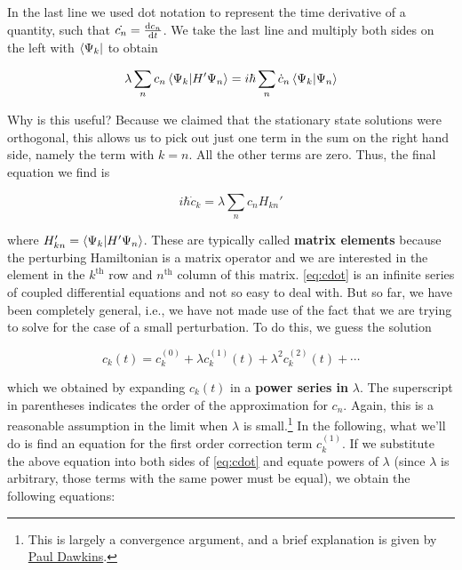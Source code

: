 In the last line we used dot notation to represent the time derivative of a quantity, such that $\dot{c_n} = \dv{c_n}{t}$. 
We take the last line and multiply both sides on the left with $\bra{\Psi_k}$ to obtain

\begin{equation*}
	\lambda \sum_n c_n \braket{\Psi_k}{H'\Psi_n} = i\hbar \sum_n \dot{c}_n \braket{\Psi_k}{\Psi_n}
\end{equation*}

Why is this useful? 
Because we claimed that the stationary state solutions were orthogonal, this allows us to pick out just one term in the sum on the right hand side, namely the term with $k = n$. 
All the other terms are zero. 
Thus, the final equation we find is

\begin{tcolorbox}[title = Relationship for $c_k$] \vspace{-2ex}
	\begin{equation}
		i\hbar \dot{c}_k = \lambda \sum_n c_n H_{kn}' \label{eq:cdot}
	\end{equation}
\end{tcolorbox}

\noindent where $H_{kn}' = \braket{\Psi_k}{H'\Psi_n}$. 
These are typically called \textbf{matrix elements} because the perturbing Hamiltonian is a matrix operator and we are interested in the element in the $k^{\text{th}}$ row and $n^{\text{th}}$ column of this matrix. 
\autoref{eq:cdot} is an infinite series of coupled differential equations and not so easy to deal with. 
But so far, we have been completely general, i.e., we have not made use of the fact that we are trying to solve for the case of a small perturbation. 
To do this, we guess the solution

\begin{equation}
	\boxed{c_k(t) = c_k^{(0)} + \lambda c_k^{(1)}(t) + \lambda^2 c_k^{(2)}(t) + \cdots} \label{eq:c-pow}
\end{equation}

\noindent which we obtained by expanding $c_k(t)$ in a \textbf{power series in} $\lambda$. 
The superscript in parentheses indicates the order of the approximation for $c_n$. 
Again, this is a reasonable assumption in the limit when $\lambda$ is small.\footnote{This is largely a convergence argument, and a brief explanation is given by \href{http://tutorial.math.lamar.edu/Classes/CalcII/PowerSeriesandFunctions.aspx}{Paul Dawkins}.} 
In the following, what we'll do is find an equation for the first order correction term $c_k^{(1)}$. 
If we substitute the above equation into both sides of \autoref{eq:cdot} and equate powers of $\lambda$ (since $\lambda$ is arbitrary, those terms with the same power must be equal), we obtain the following equations:

